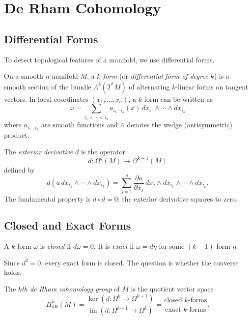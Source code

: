 \section{De Rham Cohomology}

\subsection{Differential Forms}

To detect topological features of a manifold, we use differential forms.

\begin{definition}
On a smooth $n$-manifold $M$, a \emph{$k$-form} (or \emph{differential form of degree $k$}) is a smooth section of the bundle $\Lambda^k(T^*M)$ of alternating $k$-linear forms on tangent vectors. In local coordinates $(x_1, \ldots, x_n)$, a $k$-form can be written as
\[
\omega = \sum_{i_1 < \cdots < i_k} a_{i_1 \cdots i_k}(x)\, dx_{i_1} \wedge \cdots \wedge dx_{i_k}
\]
where $a_{i_1 \cdots i_k}$ are smooth functions and $\wedge$ denotes the wedge (antisymmetric) product.
\end{definition}

The \emph{exterior derivative} $d$ is the operator
\[
d: \Omega^k(M) \to \Omega^{k+1}(M)
\]
defined by
\[
d(a\, dx_{i_1} \wedge \cdots \wedge dx_{i_k}) = \sum_{j=1}^n \frac{\partial a}{\partial x_j}\, dx_j \wedge dx_{i_1} \wedge \cdots \wedge dx_{i_k}.
\]
The fundamental property is $d \circ d = 0$: the exterior derivative squares to zero.

\subsection{Closed and Exact Forms}

\begin{definition}
A $k$-form $\omega$ is \emph{closed} if $d\omega = 0$. It is \emph{exact} if $\omega = d\eta$ for some $(k-1)$-form $\eta$.
\end{definition}

Since $d^2 = 0$, every exact form is closed. The question is whether the converse holds.

\begin{definition}
The \emph{$k$th de Rham cohomology group} of $M$ is the quotient vector space
\[
H^k_{\text{dR}}(M) = \frac{\ker(d: \Omega^k \to \Omega^{k+1})}{\operatorname{im}(d: \Omega^{k-1} \to \Omega^k)} = \frac{\text{closed } k\text{-forms}}{\text{exact } k\text{-forms}}.
\]
\end{definition}

